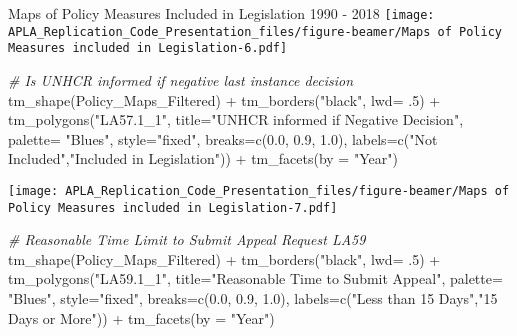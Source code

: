\documentclass[
  ignorenonframetext,
]{beamer}
\newenvironment{Shaded}{\begin{snugshade}}{\end{snugshade}}
\newcommand{\AttributeTok}[1]{\textcolor[rgb]{0.77,0.63,0.00}{#1}}
\newcommand{\CommentTok}[1]{\textcolor[rgb]{0.56,0.35,0.01}{\textit{#1}}}
\newcommand{\DecValTok}[1]{\textcolor[rgb]{0.00,0.00,0.81}{#1}}
\newcommand{\FloatTok}[1]{\textcolor[rgb]{0.00,0.00,0.81}{#1}}
\newcommand{\FunctionTok}[1]{\textcolor[rgb]{0.00,0.00,0.00}{#1}}
\newcommand{\NormalTok}[1]{#1}
\newcommand{\SpecialCharTok}[1]{\textcolor[rgb]{0.00,0.00,0.00}{#1}}
\newcommand{\StringTok}[1]{\textcolor[rgb]{0.31,0.60,0.02}{#1}}
\begin{document}
\begin{frame}[fragile]{Maps of Policy Measures Included in Legislation
1990 - 2018}
\texttt{[image: APLA\_Replication\_Code\_Presentation\_files/figure-beamer/Maps of Policy Measures included in Legislation-6.pdf]}

\begin{Shaded}
\begin{Highlighting}[]
\CommentTok{\# Is UNHCR informed if negative last instance decision}
\FunctionTok{tm\_shape}\NormalTok{(Policy\_Maps\_Filtered) }\SpecialCharTok{+} \FunctionTok{tm\_borders}\NormalTok{(}\StringTok{"black"}\NormalTok{, }\AttributeTok{lwd=}\NormalTok{ .}\DecValTok{5}\NormalTok{) }\SpecialCharTok{+} \FunctionTok{tm\_polygons}\NormalTok{(}\StringTok{"LA57.1\_1"}\NormalTok{, }\AttributeTok{title=}\StringTok{"UNHCR informed if Negative Decision"}\NormalTok{, }\AttributeTok{palette=} \StringTok{"Blues"}\NormalTok{, }\AttributeTok{style=}\StringTok{"fixed"}\NormalTok{, }\AttributeTok{breaks=}\FunctionTok{c}\NormalTok{(}\FloatTok{0.0}\NormalTok{, }\FloatTok{0.9}\NormalTok{, }\FloatTok{1.0}\NormalTok{), }\AttributeTok{labels=}\FunctionTok{c}\NormalTok{(}\StringTok{"Not Included"}\NormalTok{,}\StringTok{"Included in Legislation"}\NormalTok{)) }\SpecialCharTok{+} \FunctionTok{tm\_facets}\NormalTok{(}\AttributeTok{by =} \StringTok{"Year"}\NormalTok{)}
\end{Highlighting}
\end{Shaded}

\texttt{[image: APLA\_Replication\_Code\_Presentation\_files/figure-beamer/Maps of Policy Measures included in Legislation-7.pdf]}

\begin{Shaded}
\begin{Highlighting}[]
\CommentTok{\# Reasonable Time Limit to Submit Appeal Request LA59}
\FunctionTok{tm\_shape}\NormalTok{(Policy\_Maps\_Filtered) }\SpecialCharTok{+} \FunctionTok{tm\_borders}\NormalTok{(}\StringTok{"black"}\NormalTok{, }\AttributeTok{lwd=}\NormalTok{ .}\DecValTok{5}\NormalTok{) }\SpecialCharTok{+} \FunctionTok{tm\_polygons}\NormalTok{(}\StringTok{"LA59.1\_1"}\NormalTok{, }\AttributeTok{title=}\StringTok{"Reasonable Time to Submit Appeal"}\NormalTok{, }\AttributeTok{palette=} \StringTok{"Blues"}\NormalTok{, }\AttributeTok{style=}\StringTok{"fixed"}\NormalTok{, }\AttributeTok{breaks=}\FunctionTok{c}\NormalTok{(}\FloatTok{0.0}\NormalTok{, }\FloatTok{0.9}\NormalTok{, }\FloatTok{1.0}\NormalTok{), }\AttributeTok{labels=}\FunctionTok{c}\NormalTok{(}\StringTok{"Less than 15 Days"}\NormalTok{,}\StringTok{"15 Days or More"}\NormalTok{)) }\SpecialCharTok{+} \FunctionTok{tm\_facets}\NormalTok{(}\AttributeTok{by =} \StringTok{"Year"}\NormalTok{)}
\end{Highlighting}
\end{Shaded}


\end{frame}
\end{document}
